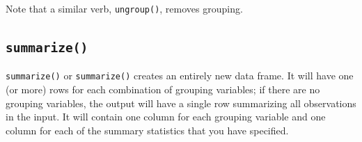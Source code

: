 \documentclass[
]{book}
\newenvironment{Shaded}{\begin{snugshade}}{\end{snugshade}}
\newcommand{\CommentTok}[1]{\textcolor[rgb]{0.56,0.35,0.01}{\textit{#1}}}
\newcommand{\DataTypeTok}[1]{\textcolor[rgb]{0.13,0.29,0.53}{#1}}
\newcommand{\DecValTok}[1]{\textcolor[rgb]{0.00,0.00,0.81}{#1}}
\newcommand{\ErrorTok}[1]{\textcolor[rgb]{0.64,0.00,0.00}{\textbf{#1}}}
\newcommand{\FloatTok}[1]{\textcolor[rgb]{0.00,0.00,0.81}{#1}}
\newcommand{\KeywordTok}[1]{\textcolor[rgb]{0.13,0.29,0.53}{\textbf{#1}}}
\newcommand{\NormalTok}[1]{#1}
\newcommand{\OperatorTok}[1]{\textcolor[rgb]{0.81,0.36,0.00}{\textbf{#1}}}
\newcommand{\StringTok}[1]{\textcolor[rgb]{0.31,0.60,0.02}{#1}}
\begin{document}
\begin{Shaded}
\end{Shaded}

Note that a similar verb, \texttt{ungroup()}, removes grouping.

\hypertarget{summarize}{%
\subsection*{\texorpdfstring{\texttt{summarize()}}{summarize()}}\label{summarize}}

\texttt{summarize()} or \texttt{summarize()} creates an entirely new data frame. It will have one (or more) rows for each combination of grouping variables; if there are no grouping variables, the output will have a single row summarizing all observations in the input. It will contain one column for each grouping variable and one column for each of the summary statistics that you have specified.

\begin{Shaded}
\end{Shaded}
\end{document}
